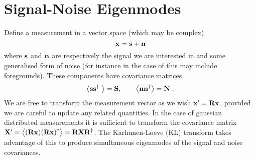 \documentclass[onecolumn]{revtex4}
\begin{document}
\section{Signal-Noise Eigenmodes}



\noindent
Define a measurement in a vector space (which may be complex)
\begin{equation}
\mathbf{x} = \mathbf{s} + \mathbf{n}
\end{equation}
where $\mathbf{s}$ and $\mathbf{n}$ are respectively the signal we are interested in and some
generalised form of noise (for instance in the case of \tcm this may include
foregrounds). These components have covariance matrices
\begin{equation}
\left\langle \mathbf{s} \mathbf{s}^{\dagger}\ \right\rangle = \mathbf{S}, \qquad \left\langle \mathbf{n} \mathbf{n}^{\dagger} \right\rangle = \mathbf{N} \; .
\end{equation}
We are free to transform the measurement vector as we wish $\mathbf{x}' = \mathbf{R}\mathbf{x}$,
provided we are careful to update any related quantities. In the case of
gaussian distributed measurements it is sufficient to transform the covariance
matrix $\mathbf{X}' = \left\langle (\mathbf{R} \mathbf{x}) (\mathbf{R} \mathbf{x})^{\dagger} \right\rangle = \mathbf{R}
\mathbf{X}\mathbf{R}^{\dagger}$. The Karhunen-Loeve (KL) transform takes advantage of this to
produce simultaneous eigenmodes of the signal and noise covariances.
\end{document}
